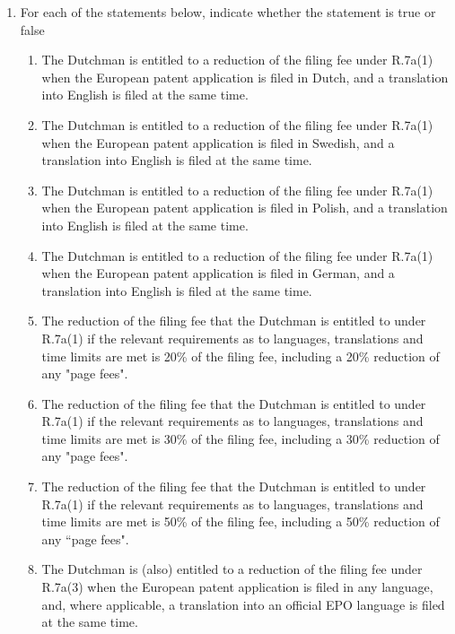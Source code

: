 \documentclass{report}
\begin{document}
\begin{enumerate}[label=\textbf{Question \arabic*}]
\begin{enumerate}[label=\textbf{Question \arabic*}]
\begin{enumerate}[label=(\alph*)]
        \item For each of the statements below, indicate whether the statement is true or false
        \begin{enumerate}[label={(\alph{enumi}.\arabic*)}]
            \item The Dutchman is entitled to a reduction of the filing fee under R.7a(1) when the European patent application is filed in Dutch, and a translation into English is filed at the same time.
            \item The Dutchman is entitled to a reduction of the filing fee under R.7a(1) when the European patent application is filed in Swedish, and a translation into English is filed at the same time.
            \item The Dutchman is entitled to a reduction of the filing fee under R.7a(1) when the European patent application is filed in Polish, and a translation into English is filed at the same time.
            \item The Dutchman is entitled to a reduction of the filing fee under R.7a(1) when the European patent application is filed in German, and a translation into English is filed at the same time.
            \item The reduction of the filing fee that the Dutchman is entitled to under R.7a(1) if the relevant requirements as to languages, translations and time limits are met is 20\% of the filing fee, including a 20\% reduction of any "page fees".
            \item The reduction of the filing fee that the Dutchman is entitled to under R.7a(1) if the relevant requirements as to languages, translations and time limits are met is 30\% of the filing fee, including a 30\% reduction of any "page fees".
            \item The reduction of the filing fee that the Dutchman is entitled to under R.7a(1) if the relevant requirements as to languages, translations and time limits are met is 50\% of the filing fee, including a 50\% reduction of any “page fees".
            \item The Dutchman is (also) entitled to a reduction of the filing fee under R.7a(3) when the European patent application is filed in any language, and, where applicable, a translation into an official EPO language is filed at the same time.
        \end{enumerate}
        

\end{enumerate}
\end{enumerate}
\end{enumerate}
\end{document}
